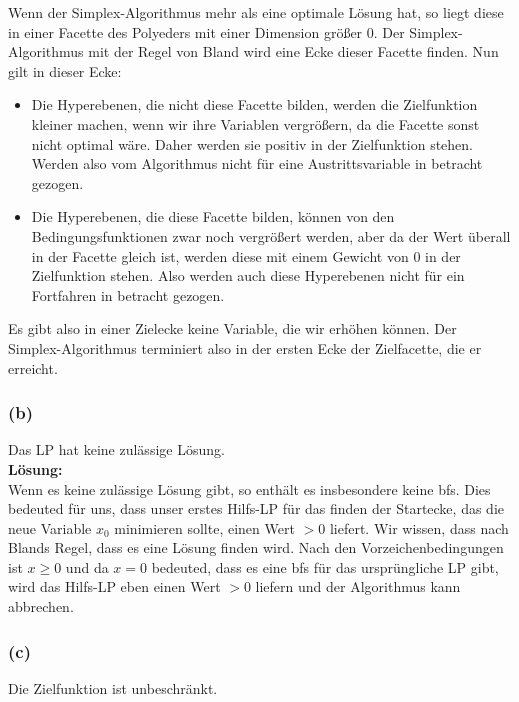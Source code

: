 \documentclass[11pt,a4paper,ngerman]{article}
\begin{document}
Wenn der Simplex-Algorithmus mehr als eine optimale Lösung hat, so liegt diese in einer Facette des Polyeders mit einer
Dimension größer $0$. Der Simplex-Algorithmus mit der Regel von Bland wird eine
Ecke dieser Facette finden.
Nun gilt in dieser Ecke:
\begin{itemize}
    \item Die Hyperebenen, die nicht diese Facette bilden, werden die Zielfunktion kleiner machen, wenn
        wir ihre Variablen vergrößern, da die Facette sonst nicht optimal wäre. 
        Daher werden sie positiv in der Zielfunktion stehen. Werden also vom Algorithmus nicht für
        eine Austrittsvariable in betracht gezogen.\\
    \item Die Hyperebenen, die diese Facette bilden, können von den Bedingungsfunktionen zwar
        noch vergrößert werden, aber da der Wert überall in der Facette gleich ist, werden
        diese mit einem Gewicht von $0$ in der Zielfunktion stehen. Also werden auch
        diese Hyperebenen nicht für ein Fortfahren in betracht gezogen.
\end{itemize}
Es gibt also in einer Zielecke keine Variable, die wir erhöhen können. Der Simplex-Algorithmus terminiert
also in der ersten Ecke der Zielfacette, die er erreicht.

\subsubsection*{(b)}
Das LP hat keine zulässige Lösung.\\

\textbf{Lösung:}\\

Wenn es keine zulässige Lösung gibt, so enthält es insbesondere keine bfs.
Dies bedeuted für uns, dass unser erstes Hilfs-LP für das finden der Startecke,
das die neue Variable $x_0$ minimieren sollte, einen Wert $>0$ liefert. Wir wissen,
dass nach Blands Regel, dass es eine Lösung finden wird. Nach den Vorzeichenbedingungen
ist $x \geq 0$ und da $x=0$ bedeuted, dass es eine bfs für das ursprüngliche LP gibt,
wird das Hilfs-LP eben einen Wert $>0$ liefern und der Algorithmus kann abbrechen.

\subsubsection*{(c)}
Die Zielfunktion ist unbeschränkt.\\
\end{document}
